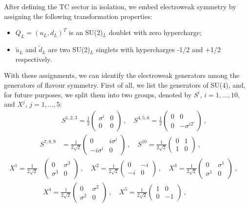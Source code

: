 After defining the  TC sector in isolation, we  embed electroweak symmetry by assigning the following transformation properties:
\begin{itemize}
\item $Q_L = (u_L,d_L)^T$ is an SU(2)$_L$ doublet with zero hypercharge;
\item $\tilde u_L$  and $\tilde d_L$ are two SU(2)$_L$ singlets with hypercharges -1/2 and +1/2 respectively. 
\end{itemize}
%
With these assignments, we can identify the electroweak generators among the generators of flavour symmetry. First of all, we list the generators of SU(4), and, for future purposes, we split them into two groups, denoted by $S^i$, $i = 1, \dots , 10$, and $X^j$, $j = 1, \dots, 5$:
\begin{equation}
\begin{split}
& S^ {1,2,3} = \frac{1}{2}
\begin{pmatrix}
\sigma^i & 0 \\
0 & 0
\end{pmatrix} \: , \quad
S^ {4,5,6} = \frac{1}{2}
\begin{pmatrix}
0 & 0 \\
0 & -\sigma^{iT}
\end{pmatrix} \: ,  \quad \\
S^ {7,8,9} & = \frac{1}{2 \sqrt 2}
\begin{pmatrix}
0 & i \sigma^i \\
-i \sigma^i & 0
\end{pmatrix} \: , \quad
S^{10} = \frac{1}{2 \sqrt 2}
\begin{pmatrix}
0 & 1 \\
1 & 0
\end{pmatrix} \: , 
\end{split} 
\label{S}
\end{equation}
\begin{equation}
\begin{split}
X^1 = \frac{1}{2 \sqrt 2}
& \begin{pmatrix}
0 & \sigma^3 \\
\sigma^3 & 0
\end{pmatrix} \:  , \quad
X^2 = \frac{1}{2 \sqrt 2}
\begin{pmatrix}
0 & -i \\
-i & 0
\end{pmatrix} \: ,  \quad 
X^3 = \frac{1}{2 \sqrt 2}
\begin{pmatrix}
0 & \sigma^1 \\
\sigma^1 & 0
\end{pmatrix} \: ,  \quad \\
& X^4 = \frac{1}{2 \sqrt 2}
\begin{pmatrix}
0 & \sigma^2 \\
\sigma^2 & 0
\end{pmatrix} \: , \quad
X^5 = \frac{1}{2 \sqrt 2} 
\begin{pmatrix}
1 & 0 \\
0 & -1
\end{pmatrix} \: ,
\end{split} 
\label{X}
\end{equation}
